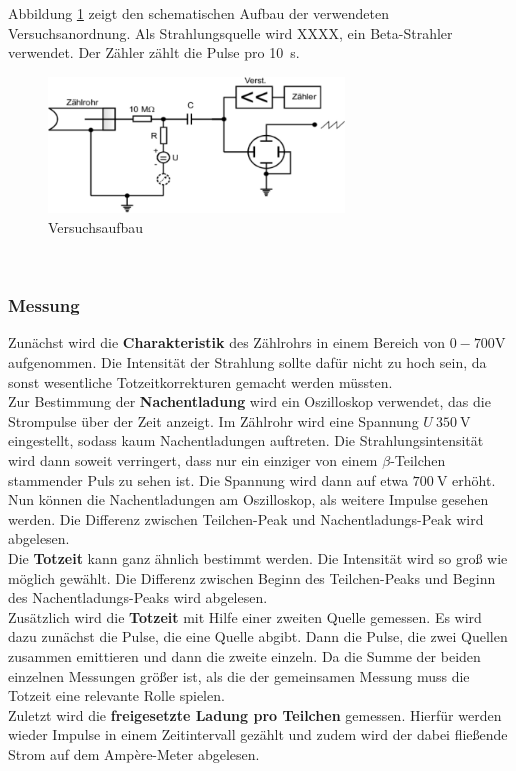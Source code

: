 Abbildung \ref{fig:Versuchsaufbau} zeigt den schematischen Aufbau der verwendeten Versuchsanordnung. Als Strahlungsquelle wird XXXX, ein Beta-Strahler verwendet. Der Zähler zählt die Pulse pro \SI{10}{\second}.
\begin{figure}[h!]
	\centering
	\includegraphics[width=0.7\textwidth]{Versuchsaufbau.pdf}
	\caption{Versuchsaufbau}
	\label{fig:Versuchsaufbau}
\end{figure} \\
\subsubsection*{Messung}
Zunächst wird die \textbf{Charakteristik} des Zählrohrs in einem Bereich von $0-700$V aufgenommen. Die Intensität der Strahlung sollte dafür nicht zu hoch sein, da sonst wesentliche Totzeitkorrekturen gemacht werden müssten. \\
Zur Bestimmung der \textbf{Nachentladung} wird ein Oszilloskop verwendet, das die Strompulse über der Zeit anzeigt. Im Zählrohr wird eine Spannung $U~\SI{350}{\volt}$ eingestellt, sodass kaum Nachentladungen auftreten. Die Strahlungsintensität wird dann soweit verringert, dass nur ein einziger von einem $\beta$-Teilchen stammender Puls zu sehen ist. Die Spannung wird dann auf etwa $\SI{700}{\volt}$ erhöht. Nun können die Nachentladungen am Oszilloskop, als weitere Impulse gesehen werden. Die Differenz zwischen Teilchen-Peak und Nachentladungs-Peak wird abgelesen. \\
Die \textbf{Totzeit} kann ganz ähnlich bestimmt werden. Die Intensität wird so groß wie möglich gewählt. Die Differenz zwischen Beginn des Teilchen-Peaks und Beginn des Nachentladungs-Peaks wird abgelesen. \\
Zusätzlich wird die \textbf{Totzeit} mit Hilfe einer zweiten Quelle gemessen. Es wird dazu zunächst die Pulse, die eine Quelle abgibt. Dann die Pulse, die zwei Quellen zusammen emittieren und dann die zweite einzeln. Da die Summe der beiden einzelnen Messungen größer ist, als die der gemeinsamen Messung muss die Totzeit eine relevante Rolle spielen. \\
Zuletzt wird die \textbf{freigesetzte Ladung pro Teilchen} gemessen. Hierfür werden wieder Impulse in einem Zeitintervall gezählt und zudem wird der dabei fließende Strom auf dem Ampère-Meter abgelesen.
